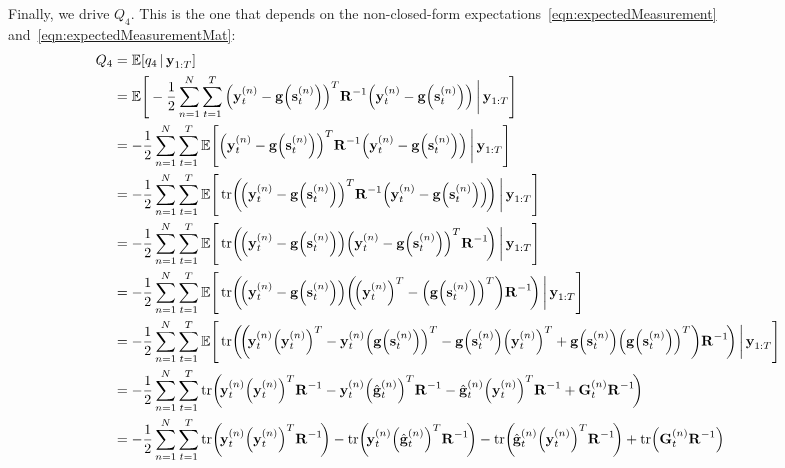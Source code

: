 Finally, we drive \(Q_4\). This is the one that depends on the non-closed-form expectations~\ref{eqn:expectedMeasurement} and~\ref{eqn:expectedMeasurementMat}:
\begin{align*}
	Q_4
		&= \E[q_4 \given \vec{y}_{1:T}] \\
		&= \E\Bigg[ -\frac{1}{2} \sum_{n = 1}^{N} \sum_{t = 1}^{T} \Big( \vec{y}_t^{(n)} - \vec{g}\Big(\vec{s}_t^{(n)}\Big) \Big)^T \mat{R}^{-1} \Big( \vec{y}_t^{(n)} - \vec{g}\Big(\vec{s}_t^{(n)}\Big) \Big) \bigggiven \vec{y}_{1:T} \Bigg] \\
		&= -\frac{1}{2} \sum_{n = 1}^{N} \sum_{t = 1}^{T} \E\Bigg[ \Big( \vec{y}_t^{(n)} - \vec{g}\Big(\vec{s}_t^{(n)}\Big) \Big)^T \mat{R}^{-1} \Big( \vec{y}_t^{(n)} - \vec{g}\Big(\vec{s}_t^{(n)}\Big) \Big) \bigggiven \vec{y}_{1:T} \Bigg] \\
		&= -\frac{1}{2} \sum_{n = 1}^{N} \sum_{t = 1}^{T} \E\Bigg[ \tr\!\bigg(\!\Big( \vec{y}_t^{(n)} - \vec{g}\Big(\vec{s}_t^{(n)}\Big) \Big)^T \mat{R}^{-1} \Big( \vec{y}_t^{(n)} - \vec{g}\Big(\vec{s}_t^{(n)}\Big) \Big)\!\bigg) \bigggiven \vec{y}_{1:T} \Bigg] \\
		&= -\frac{1}{2} \sum_{n = 1}^{N} \sum_{t = 1}^{T} \E\Bigg[ \tr\!\bigg(\!\Big( \vec{y}_t^{(n)} - \vec{g}\Big(\vec{s}_t^{(n)}\Big) \Big) \Big( \vec{y}_t^{(n)} - \vec{g}\Big(\vec{s}_t^{(n)}\Big) \Big)^T \mat{R}^{-1} \!\bigg) \bigggiven \vec{y}_{1:T} \Bigg] \\
		&= -\frac{1}{2} \sum_{n = 1}^{N} \sum_{t = 1}^{T} \E\Bigg[ \tr\!\bigg(\!\Big( \vec{y}_t^{(n)} - \vec{g}\Big(\vec{s}_t^{(n)}\Big) \Big) \bigg(\!\Big(\vec{y}_t^{(n)}\Big)^T - \Big(\vec{g}\Big(\vec{s}_t^{(n)}\Big)\Big)^T \bigg) \mat{R}^{-1} \!\bigg) \bigggiven \vec{y}_{1:T} \Bigg] \\
		&= -\frac{1}{2} \sum_{n = 1}^{N} \sum_{t = 1}^{T} \E\Bigg[ \tr\!\bigg(\!\bigg(\! \vec{y}_t^{(n)} \Big(\vec{y}_t^{(n)}\Big)^T - \vec{y}_t^{(n)} \Big(\vec{g}\Big(\vec{s}_t^{(n)}\Big)\Big)^T - \vec{g}\Big(\vec{s}_t^{(n)}\Big) \Big(\vec{y}_t^{(n)}\Big)^T + \vec{g}\Big(\vec{s}_t^{(n)}\Big) \Big(\vec{g}\Big(\vec{s}_t^{(n)}\Big)\Big)^T \bigg) \mat{R}^{-1} \!\bigg) \bigggiven \vec{y}_{1:T} \Bigg] \\
		&= -\frac{1}{2} \sum_{n = 1}^{N} \sum_{t = 1}^{T} \tr\!\bigg(\! \vec{y}_t^{(n)} \Big(\vec{y}_t^{(n)}\Big)^T \mat{R}^{-1} - \vec{y}_t^{(n)} \Big(\hat{\vec{g}}_t^{(n)}\Big)^T \mat{R}^{-1} - \hat{\vec{g}}_t^{(n)} \Big(\vec{y}_t^{(n)}\Big)^T \mat{R}^{-1} + \mat{G}_t^{(n)} \mat{R}^{-1} \!\bigg) \\
		&= -\frac{1}{2} \sum_{n = 1}^{N} \sum_{t = 1}^{T} \tr\!\bigg(\! \vec{y}_t^{(n)} \Big(\vec{y}_t^{(n)}\Big)^T \mat{R}^{-1} \!\bigg) - \tr\!\bigg(\! \vec{y}_t^{(n)} \Big(\hat{\vec{g}}_t^{(n)}\Big)^T \mat{R}^{-1} \!\bigg) - \tr\!\bigg(\! \hat{\vec{g}}_t^{(n)} \Big(\vec{y}_t^{(n)}\Big)^T \mat{R}^{-1} \!\bigg) + \tr\!\Big( \mat{G}_t^{(n)} \mat{R}^{-1} \Big) \\
\end{align*}

